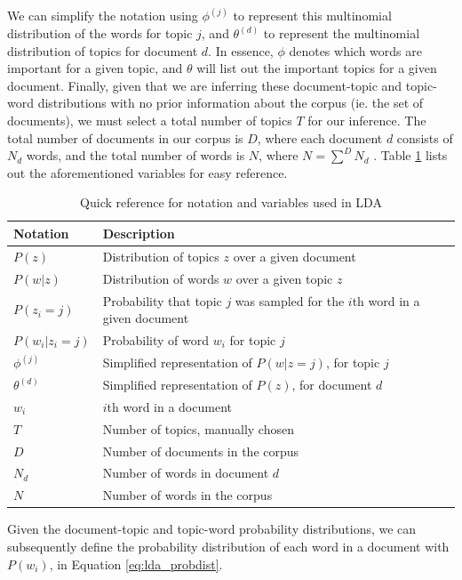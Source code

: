 \documentclass[a4paper]{article}
\begin{document}
We can simplify the notation using $\phi^{(j)}$ to represent this multinomial distribution of the words for topic $j$, and $\theta^{(d)}$ to represent the multinomial distribution of topics for document $d$. In essence, $\phi$ denotes which words are important for a given topic, and $\theta$ will list out the important topics for a given document. Finally, given that we are inferring these document-topic and topic-word distributions with no prior information about the corpus (ie. the set of documents), we must select a total number of topics $T$ for our inference. The total number of documents in our corpus is $D$, where each document $d$ consists of $N_d$ words, and the total number of words is $N$, where $N = \sum\limits^D{N_d}$ \cite{lda}. Table \ref{tab:ldavars} lists out the aforementioned variables for easy reference.
\begin{table}[h]
  \centering %
  \begin{tabular}{ |l|l| }
    \hline
    Notation & Description \\
    \hline
    \hline
    $P(z)$ & Distribution of topics $z$ over a given document \\
    $P(w | z)$ & Distribution of words $w$ over a given topic $z$ \\
    $P(z_i = j)$ & Probability that topic $j$ was sampled for the $i$th word in a given document \\
    $P(w_i | z_i = j)$ & Probability of word $w_i$ for topic $j$ \\
    $\phi^{(j)}$ & Simplified representation of $P(w | z = j)$, for topic $j$ \\
    $\theta^{(d)}$ & Simplified representation of $P(z)$, for document $d$ \\
    $w_i$ & $i$th word in a document \\
    $T$ & Number of topics, manually chosen \\
    $D$ & Number of documents in the corpus \\
    $N_d$ & Number of words in document $d$ \\
    $N$ & Number of words in the corpus \\
    \hline
  \end{tabular}
  \caption{Quick reference for notation and variables used in LDA}
  \label{tab:ldavars}
\end{table}

Given the document-topic and topic-word probability distributions, we can subsequently define the probability distribution of each word in a document with $P(w_i)$, in Equation \ref{eq:lda_probdist}.
\end{document}
